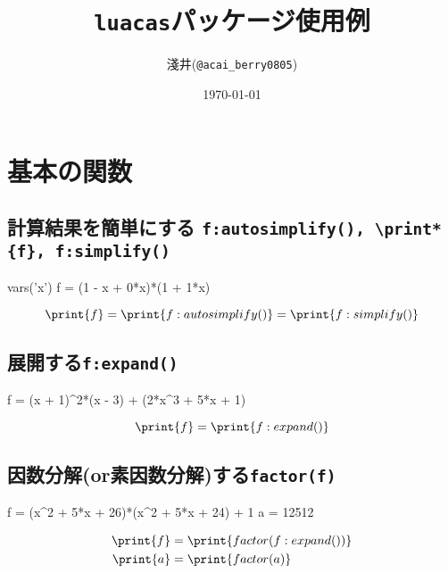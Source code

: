 \documentclass{jlreq}
\begin{document}
\title{\texttt{luacas}パッケージ使用例}
\author{淺井(\texttt{@acai\_berry0805})}
\date{\today}
\maketitle


\section{基本の関数}


\subsection{
	計算結果を簡単にする
	\quad\texttt{f:autosimplify(), \textbackslash print*\{f\}, f:simplify()}
}
\begin{CAS}
	vars('x') %
	f = (1 - x + 0*x)*(1 + 1*x)
\end{CAS}
\[\print{f}=\print{f:autosimplify()} = \print{f:simplify()}\]


\subsection{展開する\quad\texttt{f:expand()}}
\begin{CAS}
	f = (x + 1)^2*(x - 3) + (2*x^3 + 5*x + 1)
\end{CAS}
\[\print{f}=\print{f:expand()}\]


\subsection{因数分解(or素因数分解)する\quad\texttt{factor(f)}}
\begin{CAS}
	f = (x^2 + 5*x + 26)*(x^2 + 5*x + 24) + 1
	a = 12512
\end{CAS}
\begin{align*}
	\print{f} & =\print{factor(f:expand())} \\
	\print{a} & =\print{factor(a)}
\end{align*}
\end{document}

